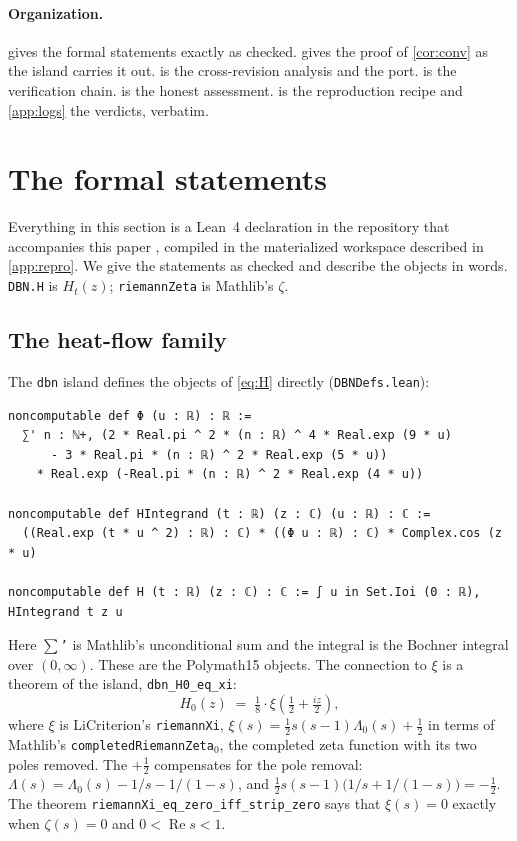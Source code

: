 \documentclass[11pt]{article}
\theoremstyle{definition}
\newcommand{\lean}[1]{\texttt{#1}}
\newcommand{\Lam}{\Lambda}
\newcommand{\Hfun}{H}
\newcommand{\re}{\operatorname{Re}}
\begin{document}
\paragraph{Organization.}  gives the formal statements exactly as checked.  gives the proof of \cref{cor:conv} as the island carries it out.  is the cross-revision analysis and the port.  is the verification chain.  is the honest assessment.  is the reproduction recipe and \cref{app:logs} the verdicts, verbatim.

\section{The formal statements}\label{sec:statements}

Everything in this section is a Lean~4 declaration in the repository that accompanies this paper \cite{Repo}, compiled in the materialized workspace described in \cref{app:repro}. We give the statements as checked and describe the objects in words. \lean{DBN.H} is $\Hfun_t(z)$; \lean{riemannZeta} is Mathlib's $\zeta$.

\subsection{The heat-flow family}

The \lean{dbn} island defines the objects of \cref{eq:H} directly (\lean{DBNDefs.lean}):
\begin{lstlisting}
noncomputable def Φ (u : ℝ) : ℝ :=
  ∑' n : ℕ+, (2 * Real.pi ^ 2 * (n : ℝ) ^ 4 * Real.exp (9 * u)
      - 3 * Real.pi * (n : ℝ) ^ 2 * Real.exp (5 * u))
    * Real.exp (-Real.pi * (n : ℝ) ^ 2 * Real.exp (4 * u))

noncomputable def HIntegrand (t : ℝ) (z : ℂ) (u : ℝ) : ℂ :=
  ((Real.exp (t * u ^ 2) : ℝ) : ℂ) * ((Φ u : ℝ) : ℂ) * Complex.cos (z * u)

noncomputable def H (t : ℝ) (z : ℂ) : ℂ := ∫ u in Set.Ioi (0 : ℝ), HIntegrand t z u
\end{lstlisting}
Here \lean{$\sum$'} is Mathlib's unconditional sum and the integral is the Bochner integral over $(0,\infty)$. These are the Polymath15 objects. The connection to $\xi$ is a theorem of the island, \lean{dbn\_H0\_eq\_xi}:
\[
\Hfun_0(z) \;=\; \tfrac18 \cdot \xi\!\left(\tfrac12 + \tfrac{i z}{2}\right),
\]
where $\xi$ is LiCriterion's \lean{riemannXi}, $\xi(s) = \tfrac12 s(s-1)\Lam_0(s) + \tfrac12$ in terms of Mathlib's \lean{completedRiemannZeta$_0$}, the completed zeta function with its two poles removed. The $+\tfrac12$ compensates for the pole removal: $\Lam(s) = \Lam_0(s) - 1/s - 1/(1-s)$, and $\tfrac12 s(s-1)\bigl(1/s + 1/(1-s)\bigr) = -\tfrac12$. The theorem \lean{riemannXi\_eq\_zero\_iff\_strip\_zero} says that $\xi(s) = 0$ exactly when $\zeta(s) = 0$ and $0 < \re s < 1$.
\end{document}
